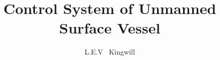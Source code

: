\documentclass[12pt, oneside, openany, a4paper, english, report]{usthesis}
\title{Control System of Unmanned Surface Vessel}
\author{L.E.V \ Kingwill}{Luke Eric Vincent Kingwill \\ 20725728}
\begin{document}
\frontmatter
	
\TitlePage

\tableofcontents
\listoffigures
\listoftables
%	
%	

\mainmatter



\end{document}
